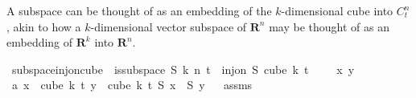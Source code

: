 \begin{isabellebody}
\begin{isamarkuptext}%
A subspace can be thought of as an embedding of the $k$-dimensional cube
  into $C^n_t$, akin to how a $k$-dimensional vector subspace of $\mathbf{R}^n$ may be thought of as an embedding of $\mathbf{R}^k$ into $\mathbf{R}^n$.%
\end{isamarkuptext}\isamarkuptrue%
\isamarkupfalse%
\ subspace{\isacharunderscore}{\kern0pt}inj{\isacharunderscore}{\kern0pt}on{\isacharunderscore}{\kern0pt}cube{\isacharcolon}{\kern0pt}\ \ {\isachardoublequoteopen}is{\isacharunderscore}{\kern0pt}subspace\ S\ k\ n\ t{\isachardoublequoteclose}\ \ {\isachardoublequoteopen}inj{\isacharunderscore}{\kern0pt}on\ S\ {\isacharparenleft}{\kern0pt}cube\ k\ t{\isacharparenright}{\kern0pt}{\isachardoublequoteclose}\isanewline
%
\isadelimproof
%
\endisadelimproof
%
\isatagproof
{}\isamarkupfalse%
\ \isanewline
\ \isamarkupfalse%
\ x\ y\isanewline
\ \isamarkupfalse%
\ a{\isacharcolon}{\kern0pt}\ {\isachardoublequoteopen}x\ {\isasymin}\ cube\ k\ t{\isachardoublequoteclose}\ {\isachardoublequoteopen}y\ {\isasymin}\ cube\ k\ t{\isachardoublequoteclose}\ {\isachardoublequoteopen}S\ x\ {\isacharequal}{\kern0pt}\ S\ y{\isachardoublequoteclose}\isanewline
\ \isamarkupfalse%
\ assms\ \isamarkupfalse%

\end{isabellebody}
